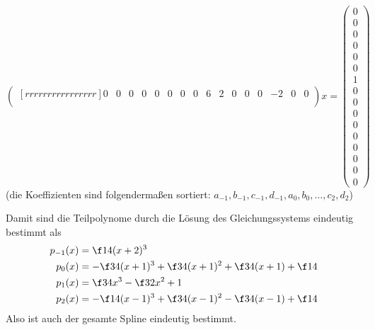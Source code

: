 \documentclass[a4paper]{scrartcl}
\begin{document}
\begin{aufgabe}
\[\begin{pmatrix}[rrrrrrrrrrrrrrrr]
			0 & 0 & 0 & 0 & 0 & 0 & 0 & 0 & 6 & 2 & 0 & 0 & 0 &-2 & 0 & 0 \\
		\end{pmatrix}
		x =
		\begin{pmatrix}
			0 \\ 0 \\ 0 \\ 0 \\ 0 \\ 0 \\ 1 \\ 0 \\ 0 \\ 0 \\ 0 \\ 0 \\ 0 \\ 0 \\ 0 \\ 0
		\end{pmatrix}
	\]
	(die Koeffizienten sind folgendermaßen sortiert: $a_{-1}, b_{-1}, c_{-1}, d_{-1}, a_0, b_0, \dotsc, c_2, d_2$)

	Damit sind die Teilpolynome durch die Lösung des Gleichungssystems eindeutig bestimmt als
	\begin{align*}
		p_{-1}(x) &= \f 14 (x+2)^3 \\
		p_{0}(x) &= -\f 34 (x+1)^3 + \f 34 (x+1)^2 + \f 34 (x+1) + \f 14 \\
		p_{1}(x) &= \f 34 x^3 - \f 32 x^2 + 1 \\
		p_{2}(x) &= -\f 14 (x-1)^3 + \f 34 (x-1)^2 - \f 34 (x-1) + \f 14 \\
	\end{align*}
	Also ist auch der gesamte Spline eindeutig bestimmt.
\end{aufgabe}
\end{document}
